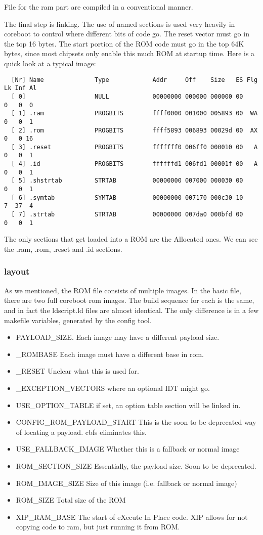 \documentclass[titlepage,12pt]{article}
\begin{document}
File for the ram part are compiled in a conventional manner. 

The final step is linking. The use of named sections is used very heavily in coreboot to control where different bits of code go. The reset vector must go in the top 16 bytes. The start portion of the ROM code must go in the top 64K bytes, since most chipsets only enable this much ROM at startup time. Here is a quick look at a typical image: 
\begin{verbatim}
  [Nr] Name              Type            Addr     Off    Size   ES Flg Lk Inf Al
  [ 0]                   NULL            00000000 000000 000000 00      0   0  0
  [ 1] .ram              PROGBITS        ffff0000 001000 005893 00  WA  0   0  1
  [ 2] .rom              PROGBITS        ffff5893 006893 00029d 00  AX  0   0 16
  [ 3] .reset            PROGBITS        fffffff0 006ff0 000010 00   A  0   0  1
  [ 4] .id               PROGBITS        ffffffd1 006fd1 00001f 00   A  0   0  1
  [ 5] .shstrtab         STRTAB          00000000 007000 000030 00      0   0  1
  [ 6] .symtab           SYMTAB          00000000 007170 000c30 10      7  37  4
  [ 7] .strtab           STRTAB          00000000 007da0 000bfd 00      0   0  1
\end{verbatim}

The only sections that get loaded into a ROM are the Allocated ones. We can see the .ram, .rom, .reset and .id sections. 
\subsubsection{layout}
As we mentioned, the ROM file consists of multiple images. In the basic file, there are two full coreboot rom images. The build sequence for each is the same, and in fact the ldscript.ld files are almost identical. The only difference is in a few makefile variables, generated by the config tool. 

\begin{itemize}
\item PAYLOAD\_SIZE. Each image may have a different payload size. 
\item \_ROMBASE Each image must have a different base in rom. 
\item \_RESET Unclear what this is used for. 
\item \_EXCEPTION\_VECTORS where an optional IDT might go.
\item USE\_OPTION\_TABLE if set, an option table section will be linked in. 
\item CONFIG\_ROM\_PAYLOAD\_START This is the soon-to-be-deprecated way of locating a payload. cbfs eliminates this. 
\item USE\_FALLBACK\_IMAGE Whether this is a fallback or normal image
\item ROM\_SECTION\_SIZE Essentially, the payload size. Soon to be deprecated. 
\item ROM\_IMAGE\_SIZE Size of this image (i.e. fallback or normal image)
\item ROM\_SIZE Total size of the ROM
\item XIP\_RAM\_BASE The start of eXecute In Place code. XIP allows for not copying code to ram, but just running it from ROM. 
\end{itemize}
\end{document}
